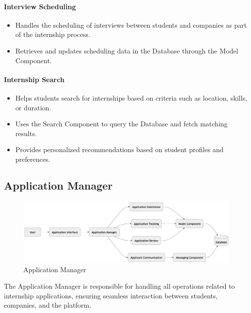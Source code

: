\paragraph{Interview Scheduling}
\begin{itemize}
    \item Handles the scheduling of interviews between students and companies as part of the internship process.
    \item Retrieves and updates scheduling data in the Database through the Model Component.
\end{itemize}

\paragraph{Internship Search}
\begin{itemize}
    \item Helps students search for internships based on criteria such as location, skills, or duration.
    \item Uses the Search Component to query the Database and fetch matching results.
    \item Provides personalized recommendations based on student profiles and preferences.
\end{itemize}

\subsection{Application Manager}
\label{subsec:application_manager}
\begin{figure}[H]
    \begin{center}
        \includegraphics[width=0.82\linewidth]{JhaBhatiaSharma/imagesDD/ApplicationManager.png}
        \caption{Application Manager}
        \label{fig:applicationmanager}%
    \end{center}
\end{figure}

The Application Manager is responsible for handling all operations related to internship applications, ensuring seamless interaction between students, companies, and the platform.


